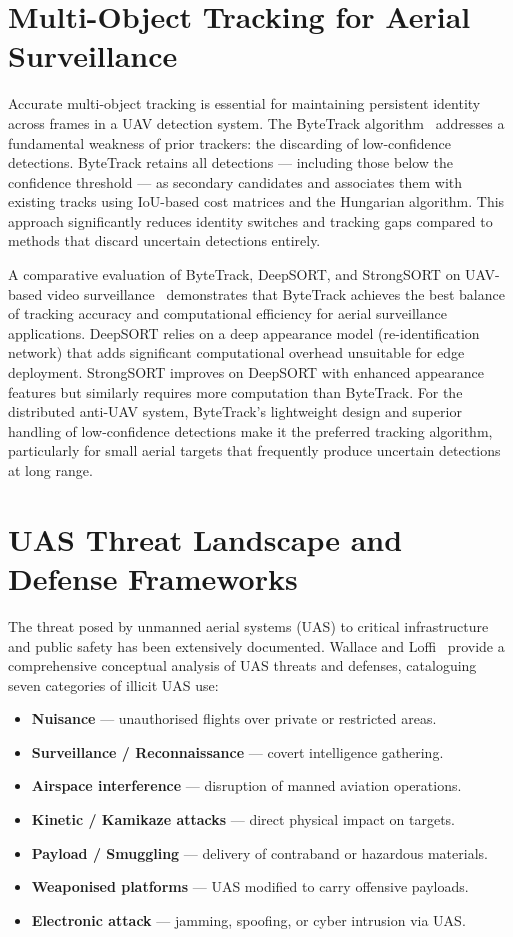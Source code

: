 \documentclass[12pt,a4paper]{report}
\begin{document}
\section{Multi-Object Tracking for Aerial Surveillance}

Accurate multi-object tracking is essential for maintaining persistent
identity across frames in a UAV detection system. The ByteTrack
algorithm~\cite{zhang2022bytetrack} addresses a fundamental weakness of
prior trackers: the discarding of low-confidence detections. ByteTrack
retains all detections --- including those below the confidence threshold
--- as secondary candidates and associates them with existing tracks using
IoU-based cost matrices and the Hungarian algorithm. This approach
significantly reduces identity switches and tracking gaps compared to
methods that discard uncertain detections entirely.

A comparative evaluation of ByteTrack, DeepSORT, and StrongSORT on
UAV-based video surveillance~\cite{bytetrack_comparison} demonstrates
that ByteTrack achieves the best balance of tracking accuracy and
computational efficiency for aerial surveillance applications. DeepSORT
relies on a deep appearance model (re-identification network) that adds
significant computational overhead unsuitable for edge deployment.
StrongSORT improves on DeepSORT with enhanced appearance features but
similarly requires more computation than ByteTrack. For the distributed
anti-UAV system, ByteTrack's lightweight design and superior handling of
low-confidence detections make it the preferred tracking algorithm,
particularly for small aerial targets that frequently produce uncertain
detections at long range.

\section{UAS Threat Landscape and Defense Frameworks}

The threat posed by unmanned aerial systems (UAS) to critical infrastructure
and public safety has been extensively documented. Wallace and
Loffi~\cite{wallace2015uas} provide a comprehensive conceptual analysis
of UAS threats and defenses, cataloguing seven categories of illicit UAS use:

\begin{itemize}
  \item \textbf{Nuisance} --- unauthorised flights over private or restricted areas.
  \item \textbf{Surveillance / Reconnaissance} --- covert intelligence gathering.
  \item \textbf{Airspace interference} --- disruption of manned aviation operations.
  \item \textbf{Kinetic / Kamikaze attacks} --- direct physical impact on targets.
  \item \textbf{Payload / Smuggling} --- delivery of contraband or hazardous materials.
  \item \textbf{Weaponised platforms} --- UAS modified to carry offensive payloads.
  \item \textbf{Electronic attack} --- jamming, spoofing, or cyber intrusion via UAS.
\end{itemize}
\end{document}
